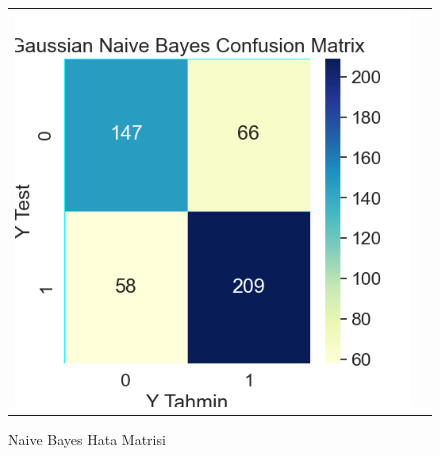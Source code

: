 \documentclass[conference]{IEEEtran}
\begin{document}
\begin{figure}[!h]
	\centering
	\begin{center}
		\begin{tabular}{cc}
			\includegraphics[scale=0.45]{pictures/pic_13.png}&
		\end{tabular}
	\end{center}
	\caption{Naive Bayes Hata Matrisi}
	\label{fig:13}
\end{figure}
\end{document}
